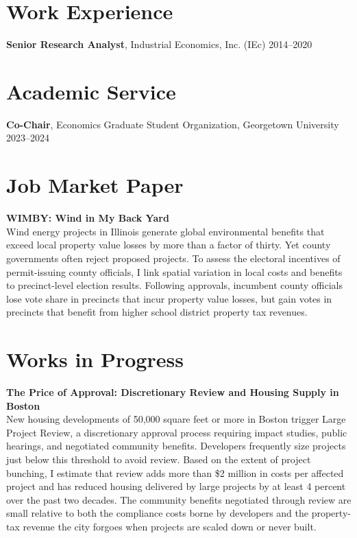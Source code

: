 \documentclass[11pt]{article}
\begin{document}
\section*{Work Experience}

\textbf{Senior Research Analyst}, Industrial Economics, Inc. (IEc) \hfill 2014–2020

\section*{Academic Service}

\textbf{Co-Chair}, Economics Graduate Student Organization, Georgetown University \hfill 2023–2024

\section*{Job Market Paper}

\textbf{WIMBY: Wind in My Back Yard} \\
Wind energy projects in Illinois generate global environmental benefits that exceed local property value losses by more than a factor of thirty. Yet county governments often reject proposed projects. To assess the electoral incentives of permit-issuing county officials, I link spatial variation in local costs and benefits to precinct-level election results. Following approvals, incumbent county officials lose vote share in precincts that incur property value losses, but gain votes in precincts that benefit from higher school district property tax revenues.
\section*{Works in Progress}
\textbf{The Price of Approval: Discretionary Review and Housing Supply in Boston} \\
New housing developments of 50,000 square feet or more in Boston trigger Large Project Review, a discretionary approval process requiring impact studies, public hearings, and negotiated community benefits. Developers frequently size projects just below this threshold to avoid review. Based on the extent of project bunching, I estimate that review adds more than \$2 million in costs per affected project and has reduced housing delivered by large projects by at least 4 percent over the past two decades. The community benefits negotiated through review are small relative to both the compliance costs borne by developers and the property-tax revenue the city forgoes when projects are scaled down or never built. 
\end{document}
